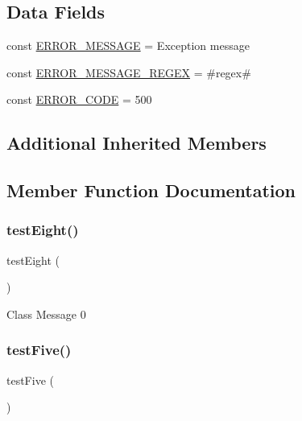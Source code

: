 \subsection*{Data Fields}
\begin{DoxyCompactItemize}
\item 
const \mbox{\hyperlink{class_exception_test_a7ee5ba193850ba436589d042e5b1d782}{E\+R\+R\+O\+R\+\_\+\+M\+E\+S\+S\+A\+GE}} = \textquotesingle{}Exception message\textquotesingle{}
\item 
const \mbox{\hyperlink{class_exception_test_ad8e752fa8d9daa454f3042b2601154bd}{E\+R\+R\+O\+R\+\_\+\+M\+E\+S\+S\+A\+G\+E\+\_\+\+R\+E\+G\+EX}} = \textquotesingle{}\#regex\#\textquotesingle{}
\item 
const \mbox{\hyperlink{class_exception_test_a2e110b3c20c6a3b00cdda9e6dbc2d830}{E\+R\+R\+O\+R\+\_\+\+C\+O\+DE}} = 500
\end{DoxyCompactItemize}
\subsection*{Additional Inherited Members}


\subsection{Member Function Documentation}
\mbox{\label{class_exception_test_a9716ac1cbf30a1f6df13338c87f06191}} 
\subsubsection{\texorpdfstring{test\+Eight()}{testEight()}}
{\footnotesize\ttfamily test\+Eight (\begin{DoxyParamCaption}{ }\end{DoxyParamCaption})}

Class  Message  0 \mbox{\label{class_exception_test_a0756440631c4db21ab3607063465834a}} 
\subsubsection{\texorpdfstring{test\+Five()}{testFive()}}
{\footnotesize\ttfamily test\+Five (\begin{DoxyParamCaption}{ }\end{DoxyParamCaption})}

